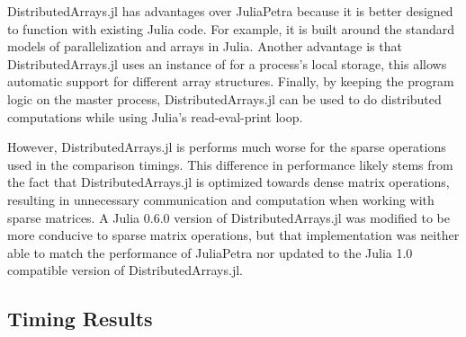 \documentclass[acmsmall]{acmart}
\newcommand{\snippet}[1]{\texttt{\detokenize{#1}}}
\begin{document}
	DistributedArrays.jl has advantages over JuliaPetra because it is better designed to function with
	existing Julia code.
	For example, it is built around the standard models of parallelization and arrays in Julia.
	Another advantage is that DistributedArrays.jl uses an instance of \snippet{AbstractArray}
	for a process's local storage, this allows automatic support for different array structures.
	Finally, by keeping the program logic on the master process, DistributedArrays.jl can be used to
	do distributed computations while using Julia's read-eval-print loop.
	
	However, DistributedArrays.jl is performs much worse for the sparse operations used in the comparison timings.
	This difference in performance likely stems from the fact that DistributedArrays.jl is optimized towards dense matrix operations, resulting in unnecessary communication and computation when working with sparse matrices.
	A Julia 0.6.0 version of DistributedArrays.jl was modified to be more conducive to sparse matrix operations, but that implementation was neither able to match the performance of JuliaPetra nor updated to the Julia 1.0 compatible version of DistributedArrays.jl.
	
	\subsection{Timing Results}
	
\end{document}
